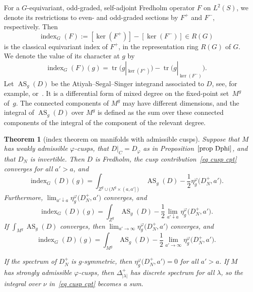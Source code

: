 \documentclass[10pt,a4paper]{amsart}
\numberwithin{equation}{section}
\newtheorem{Theorem}{Theorem}[section]
\DeclareMathOperator{\tr}{tr}
\DeclareMathOperator{\AS}{AS}
\DeclareMathOperator{\ind}{index}
\begin{document}
For a $G$-equivariant, odd-graded, self-adjoint Fredholm operator $F$ on $L^2(S)$, we denote its restrictions to even- and odd-graded sections by $F^+$ and $F^-$, respectively. Then
\[
\ind_G(F) := [\ker(F^+)] - [\ker(F^-)] \in R(G)
\]
is the classical equivariant index of $F^+$, in the representation ring $R(G)$ of $G$. We denote the value of its character at $g$ by
\[
\ind_G(F)(g) = \tr\big(g|_{\ker(F^+)}\big) - \tr\big(g|_{\ker(F^-)}\big).
\]
Let $\AS_g(D)$ be the Atiyah--Segal--Singer integrand associated to $D$, see, for example, \cite[Theo\-rem~6.16]{BGV} or~\cite[Theo\-rem~3.9]{ASIII}. It is a differential form of mixed degree on the fixed-point set~$M^g$ of~$g$. The connected components of $M^g$ may have different dimensions, and the integral of $\AS_g(D)$ over $M^g$ is defined as the sum over these connected components of the integral of the component of the relevant degree.

\begin{Theorem}[index theorem on manifolds with admissible cusps]\label{thm index cusps}
Suppose that $M$ has weakly admissible $\varphi$-cusps, that $D|_C = D_{\varphi}$ as in Proposition~$\ref{prop Dphi}$, and that $D_N$ is invertible.
Then $D$ is Fredholm, the cusp contribution~\eqref{eq cusp cpt} converges for all $a'>a$, and
\begin{equation} \label{eq index cusps}
\ind_G(D)(g) = \int_{Z^g \cup (N^g \times (a,a'])} \AS_g(D) - \frac{1}{2}\eta_g^{\varphi}\big(D_N^+,a'\big).
\end{equation}
Furthermore, $\lim_{a' \downarrow a}\eta_g^{\varphi}\big(D_N^+,a'\big)$ converges, and
\begin{equation} \label{eq index cusps 2}
\ind_G(D)(g) = \int_{Z^g} \AS_g(D) - \frac{1}{2}\lim_{a' \downarrow a} \eta_g^{\varphi}\big(D_N^+,a'\big).
\end{equation}
If $\int_{M^g} \AS_g(D)$ converges, then $\lim_{a' \to \infty}\eta_g^{\varphi}\big(D_N^+,a'\big)$ converges, and
\begin{equation} \label{eq index cusps 3}
\ind_G(D)(g) = \int_{M^g} \AS_g(D) - \frac{1}{2}\lim_{a' \to \infty} \eta_g^{\varphi}\big(D_N^+,a'\big).
\end{equation}

If the spectrum of $D_N^+$ is $g$-symmetric, then $\eta_g^{\varphi}\big(D_N^+, a'\big) = 0$ for all $a'>a$.
If $M$ has strongly admissible $\varphi$-cusps, then $\Delta_{|\lambda|}^+$ has discrete spectrum for all $\lambda$, so the integral over $\nu$ in~\eqref{eq cusp cpt} becomes a sum.
\end{Theorem}
\end{document}
